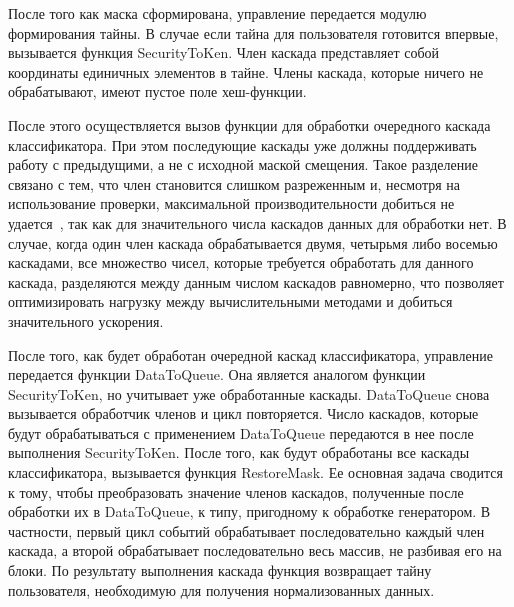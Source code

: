 После того как маска сформирована, управление передается модулю формирования тайны. В случае если тайна для пользователя готовится впервые, вызывается функция SecurityToKen. Член каскада представляет собой координаты единичных элементов в тайне. Члены каскада, которые ничего не обрабатывают, имеют пустое поле хеш-функции.

После этого осуществляется вызов функции для обработки очередного каскада классификатора. При этом последующие каскады уже должны поддерживать работу с предыдущими, а не с исходной маской смещения.
Такое разделение связано с тем, что член становится слишком разреженным и, несмотря на использование проверки, максимальной производительности добиться не удается~\cite{comp_security}, так как для значительного числа каскадов данных для обработки нет.  В случае, когда один член каскада обрабатывается двумя, четырьмя либо восемью каскадами, все множество чисел, которые требуется обработать для данного каскада, разделяются между данным числом каскадов равномерно, что позволяет оптимизировать нагрузку между вычислительными методами и добиться значительного ускорения.

После того, как будет обработан очередной каскад классификатора, управление передается функции DataToQueue. Она является аналогом функции SecurityToKen, но учитывает уже обработанные каскады. DataToQueue снова вызывается обработчик членов и цикл повторяется. Число каскадов, которые будут обрабатываться с применением DataToQueue передаются в нее после выполнения SecurityToKen. После того, как будут обработаны все каскады классификатора, вызывается функция RestoreMask. Ее основная задача сводится к тому, чтобы преобразовать значение членов каскадов, полученные после обработки их в DataToQueue, к типу, пригодному к обработке генератором. В частности, первый цикл событий обрабатывает последовательно каждый член каскада, а второй обрабатывает последовательно весь массив, не разбивая его на блоки. По результату выполнения каскада функция возвращает тайну пользователя, необходимую для получения нормализованных данных.